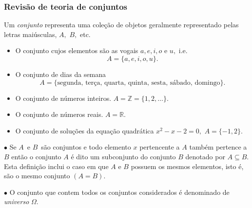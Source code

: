 \begin{frame}
\frametitle{Revisão de teoria de conjuntos}

Um {\it conjunto} representa uma coleção de objetos geralmente representado pelas letras maiúsculas, $A,$ $B,$ etc.
\begin{exem} 
\begin{itemize}
\item O conjunto cujos elementos são as vogais $a, e, i, o$ e $u,$ i.e. $$A=\{ a, e, i, o, u\}.$$ 
\item O conjunto de dias da semana $$A=\{ \text{segunda, terça, quarta, quinta, sesta, sábado, domingo} \}.$$ 
\item O conjunto de números inteiros. $A=\mathbb{Z}= \{ 1,2, \ldots \}.$ 
\item O conjunto de números reais.  $A=\mathbb{R}.$ 
\item O conjunto de soluções da equação quadrática $x^2-x-2=0,$  $A=\{ -1, 2 \}.$ 
\end{itemize}
\end{exem} 
$\bullet$ Se $A \,$ e $B \,$ são conjuntos e todo elemento $ x$ pertencente a $A$ também pertence a $B$ então o conjunto $A$ é dito um subconjunto do conjunto $B$ denotado por $A \subseteq B$. Esta definição inclui o caso em que $A$ e $B$ possuem os mesmos elementos, isto é, são o mesmo conjunto $(A = B)$.

$\bullet$ O conjunto que contem todos os conjuntos considerados é denominado de  {\it universo} $\Omega.$


\end{frame}



